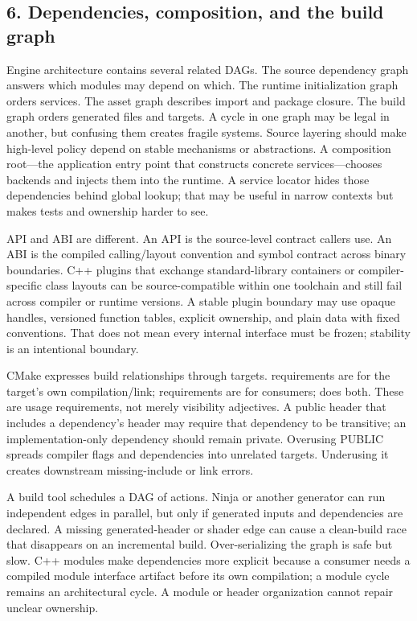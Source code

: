 \subsection{6. Dependencies, composition, and the build graph}\label{05-engine-i-ch008-dependencies-composition-and-the-build-graph}

\hypertarget{05-engine-i-ch008-dependencies-composition-and-the-build-graph}{}

Engine architecture contains several related DAGs. The source dependency graph answers which modules may depend on which. The runtime initialization graph orders services. The asset graph describes import and package closure. The build graph orders generated files and targets. A cycle in one graph may be legal in another, but confusing them creates fragile systems. Source layering should make high-level policy depend on stable mechanisms or abstractions. A composition root---the application entry point that constructs concrete services---chooses backends and injects them into the runtime. A service locator hides those dependencies behind global lookup; that may be useful in narrow contexts but makes tests and ownership harder to see.

API and ABI are different. An API is the source-level contract callers use. An ABI is the compiled calling/layout convention and symbol contract across binary boundaries. C++ plugins that exchange standard-library containers or compiler-specific class layouts can be source-compatible within one toolchain and still fail across compiler or runtime versions. A stable plugin boundary may use opaque handles, versioned function tables, explicit ownership, and plain data with fixed conventions. That does not mean every internal interface must be frozen; stability is an intentional boundary.

CMake expresses build relationships through targets.  requirements are for the target's own compilation/link;  requirements are for consumers;  does both. These are usage requirements, not merely visibility adjectives. A public header that includes a dependency's header may require that dependency to be transitive; an implementation-only dependency should remain private. Overusing PUBLIC spreads compiler flags and dependencies into unrelated targets. Underusing it creates downstream missing-include or link errors.

A build tool schedules a DAG of actions. Ninja or another generator can run independent edges in parallel, but only if generated inputs and dependencies are declared. A missing generated-header or shader edge can cause a clean-build race that disappears on an incremental build. Over-serializing the graph is safe but slow. C++ modules make dependencies more explicit because a consumer needs a compiled module interface artifact before its own compilation; a module cycle remains an architectural cycle. A module or header organization cannot repair unclear ownership.

